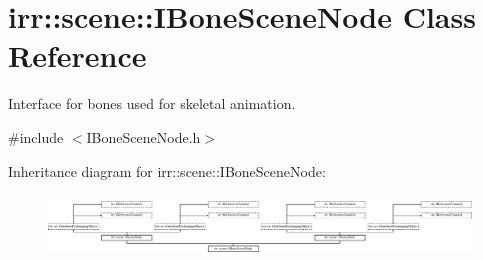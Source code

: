 \hypertarget{classirr_1_1scene_1_1IBoneSceneNode}{}\section{irr\+:\+:scene\+:\+:I\+Bone\+Scene\+Node Class Reference}
\label{classirr_1_1scene_1_1IBoneSceneNode}


Interface for bones used for skeletal animation.  




{\ttfamily \#include $<$I\+Bone\+Scene\+Node.\+h$>$}

Inheritance diagram for irr\+:\+:scene\+:\+:I\+Bone\+Scene\+Node\+:\begin{figure}[H]
\begin{center}
\leavevmode
\includegraphics[height=1.682692cm]{classirr_1_1scene_1_1IBoneSceneNode}
\end{center}
\end{figure}
